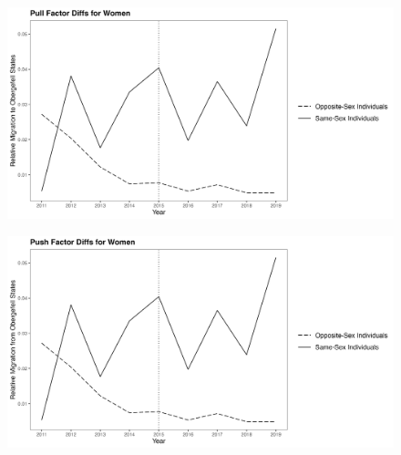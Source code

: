 \documentclass[12pt,letterpaper]{article}
\begin{document}


\begin{figure}[htbp]
    \centering
    \includegraphics[width=1\linewidth]{outputs/summary_stats/women_post_diffs.png}
    \caption{}
    \label{fig: women_post_diffs}
\end{figure}
\begin{figure}[htbp]
    \centering
    \includegraphics[width=1\linewidth]{outputs/summary_stats/women_ante_diffs.png}
    \caption{}
    \label{fig: women_ante_diffs}
\end{figure}
\end{document}
